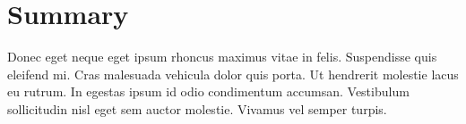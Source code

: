 \section{Summary}

{


\par Donec eget neque eget ipsum rhoncus maximus vitae in felis. Suspendisse quis eleifend mi. Cras malesuada vehicula dolor quis porta. Ut hendrerit molestie lacus eu rutrum. In egestas ipsum id odio condimentum accumsan. Vestibulum sollicitudin nisl eget sem auctor molestie. Vivamus vel semper turpis.

}
